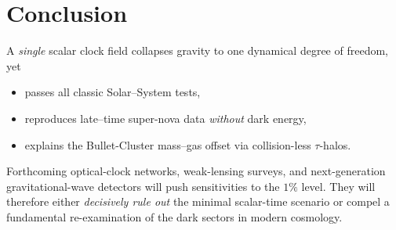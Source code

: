 \chapter*{Conclusion}

A \emph{single} scalar clock field collapses gravity to one dynamical
degree of freedom, yet

\begin{itemize}
  \item passes all classic Solar–System tests,
  \item reproduces late–time super-nova data \emph{without} dark energy,
  \item explains the Bullet-Cluster mass–gas offset via collision-less
        $\tau$-halos.
\end{itemize}

Forthcoming optical-clock networks, weak-lensing surveys, and
next-generation gravitational-wave detectors will push sensitivities to
the $1\%$ level.  They will therefore either \emph{decisively rule out}
the minimal scalar-time scenario or compel a fundamental re-examination
of the dark sectors in modern cosmology.